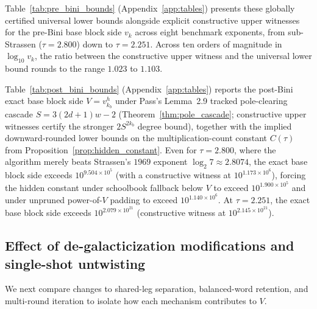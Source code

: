 \documentclass[11pt,a4paper]{article}
\theoremstyle{plain}
\theoremstyle{definition}
\theoremstyle{remark}
\begin{document}
Table~\ref{tab:pre_bini_bounds} (Appendix~\ref{app:tables}) presents these globally certified universal lower bounds alongside explicit constructive upper witnesses for the pre-Bini base block side $v_k$ across eight benchmark exponents, from sub-Strassen ($\tau = 2.800$) down to $\tau = 2.251$. Across ten orders of magnitude in $\log_{10} v_k$, the ratio between the constructive upper witness and the universal lower bound rounds to the range $1.023$ to $1.103$.

Table~\ref{tab:post_bini_bounds} (Appendix~\ref{app:tables}) reports the post-Bini exact base block side $V = v_{k_b}^h$ under Pass's Lemma~2.9 tracked pole-clearing cascade $S = 3(2d + 1)w - 2$ (Theorem~\ref{thm:pole_cascade}; constructive upper witnesses certify the stronger $2 S^{2 k_b}$ degree bound), together with the implied downward-rounded lower bounds on the multiplication-count constant $C(\tau)$ from Proposition~\ref{prop:hidden_constant}. Even for $\tau = 2.800$, where the algorithm merely beats Strassen's $1969$ exponent $\log_2 7 \approx 2.8074$, the exact base block side exceeds $10^{9.504 \times 10^5}$ (with a constructive witness at $10^{1.173 \times 10^6}$), forcing the hidden constant under schoolbook fallback below $V$ to exceed $10^{1.900 \times 10^5}$ and under unpruned power-of-$V$ padding to exceed $10^{1.140 \times 10^6}$. At $\tau = 2.251$, the exact base block side exceeds $10^{2.079 \times 10^{21}}$ (constructive witness at $10^{2.145 \times 10^{21}}$).

\subsection{Effect of de-galacticization modifications and single-shot untwisting}
\label{subsec:degalactic}

We next compare changes to shared-leg separation, balanced-word retention, and multi-round iteration to isolate how each mechanism contributes to $V$.
\end{document}
